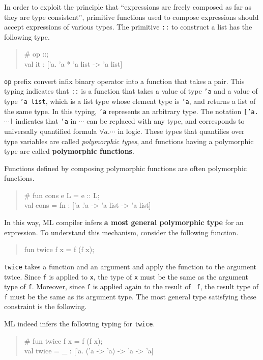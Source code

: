 \documentclass{jbook}
\newenvironment{program}{\begin{quote}\begin{tt}}%
                        {\end{tt}\end{quote}}
\begin{document}
\else%
	In order to exploit the principle that  ``expressions are freely
composed as far as they are type consistent'', primitive functions used
to compose expressions should accept expressions of various types.
	The primitive {\tt ::} to construct a list has the following type.
\begin{program}
\# op ::;\\
val it : ['a. 'a * 'a list -> 'a list]
\end{program}
	{\tt op} prefix convert infix binary operator into a function
that takes a pair.
	This typing indicates that {\tt ::} is a function that takes a
value of type {\tt 'a} and a value of type {\tt 'a list}, which is a
list type whose element type is {\tt 'a}, and returns a list of the same
type.
	In this typing, {\tt 'a} represents an arbitrary type.
	The notation {\tt ['a.$\cdots$]} indicates that {\tt 'a} in
$\cdots$ can be replaced with any type, and corresponds to universally
quantified formula $\forall a.\cdots$ in logic.
	These types that quantifies over type variables are called {\em
polymorphic types}, and functions having a polymorphic type are called 
{\bf polymorphic functions}.
	
	Functions defined by composing polymorphic functions are often
polymorphic functions.
\begin{tt}
\begin{quote}
\# fun cons  e L  = e :: L;
\\
val cons = fn : ['a .'a  ->  'a list  -> 'a list]
\end{quote}
\end{tt}
	In this way, ML compiler infers {\bf a most general polymorphic
type} for an expression.
	To understand this mechanism, consider the following function.
\begin{program}
fun twice f x = f (f x);
\end{program}
	{\tt twice} takes a function and an argument and apply the
function to the argument twice.
	Since {\tt f} is applied to {\tt x}, the type of {\tt x} must be
the same as the argument type of {\tt f}.
	Moreover, since {\tt f} is applied again to the result of {\tt
f}, the result type of {\tt f} must be the same as its argument type.
	The most general type satisfying these constraint is the following.
\begin{program}
 ['a. ('a -> 'a) -> 'a -> 'a]
\end{program}
	ML indeed infers the following typing for {\tt twice}.
\begin{tt}
\begin{quote}
\# fun twice f x = f (f x);
\\
val twice = \_ : ['a. ('a -> 'a) -> 'a -> 'a]
\end{quote}
\end{tt}
\end{document}
